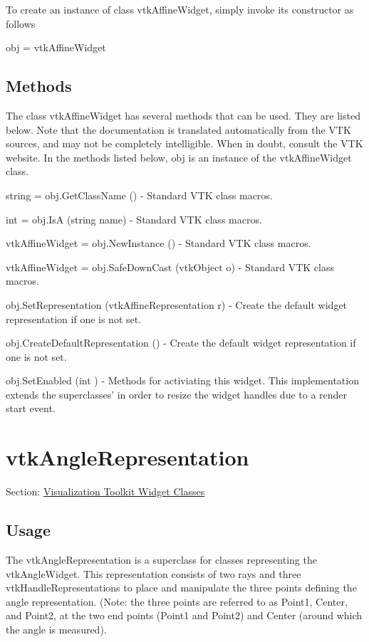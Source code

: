 To create an instance of class vtk\-Affine\-Widget, simply invoke its constructor as follows \begin{DoxyVerb}  obj = vtkAffineWidget
\end{DoxyVerb}
 \hypertarget{vtkwidgets_vtkxyplotwidget_Methods}{}\subsection{Methods}\label{vtkwidgets_vtkxyplotwidget_Methods}
The class vtk\-Affine\-Widget has several methods that can be used. They are listed below. Note that the documentation is translated automatically from the V\-T\-K sources, and may not be completely intelligible. When in doubt, consult the V\-T\-K website. In the methods listed below, {\ttfamily obj} is an instance of the vtk\-Affine\-Widget class. 
\begin{DoxyItemize}
\item {\ttfamily string = obj.\-Get\-Class\-Name ()} -\/ Standard V\-T\-K class macros.  
\item {\ttfamily int = obj.\-Is\-A (string name)} -\/ Standard V\-T\-K class macros.  
\item {\ttfamily vtk\-Affine\-Widget = obj.\-New\-Instance ()} -\/ Standard V\-T\-K class macros.  
\item {\ttfamily vtk\-Affine\-Widget = obj.\-Safe\-Down\-Cast (vtk\-Object o)} -\/ Standard V\-T\-K class macros.  
\item {\ttfamily obj.\-Set\-Representation (vtk\-Affine\-Representation r)} -\/ Create the default widget representation if one is not set.  
\item {\ttfamily obj.\-Create\-Default\-Representation ()} -\/ Create the default widget representation if one is not set.  
\item {\ttfamily obj.\-Set\-Enabled (int )} -\/ Methods for activiating this widget. This implementation extends the superclasses' in order to resize the widget handles due to a render start event.  
\end{DoxyItemize}\hypertarget{vtkwidgets_vtkanglerepresentation}{}\section{vtk\-Angle\-Representation}\label{vtkwidgets_vtkanglerepresentation}
Section\-: \hyperlink{sec_vtkwidgets}{Visualization Toolkit Widget Classes} \hypertarget{vtkwidgets_vtkxyplotwidget_Usage}{}\subsection{Usage}\label{vtkwidgets_vtkxyplotwidget_Usage}
The vtk\-Angle\-Representation is a superclass for classes representing the vtk\-Angle\-Widget. This representation consists of two rays and three vtk\-Handle\-Representations to place and manipulate the three points defining the angle representation. (Note\-: the three points are referred to as Point1, Center, and Point2, at the two end points (Point1 and Point2) and Center (around which the angle is measured).

